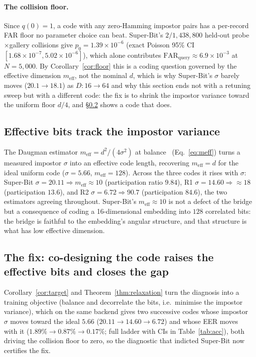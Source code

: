 \paragraph{The collision floor.} Since $q(0)=1$, a code with any zero-Hamming impostor pairs has a
per-record FAR floor no parameter choice can beat. Super-Bit's $2/1{,}438{,}800$ held-out
probe$\times$gallery collisions give $p_0 = 1.39\times10^{-6}$ (exact Poisson 95\% CI
$[1.68\times10^{-7}, 5.02\times10^{-6}]$), which alone contributes
$\mathrm{FAR}_{\text{query}}\approx6.9\times10^{-3}$ at $N=5{,}000$. By Corollary~\ref{cor:floor} this
is a coding question governed by the effective dimension $m_{\mathrm{eff}}$, not the nominal $d$, which
is why Super-Bit's $\sigma$ barely moves ($20.1 \to 18.1$) as $D:16\to64$ and why this section ends not
with a retuning sweep but with a different code: the fix is to shrink the impostor variance toward the
uniform floor $d/4$, and \S\ref{sec:fix} shows a code that does.

\subsection{Effective bits track the impostor variance}
\label{sec:effbits-params}

The Daugman estimator $m_{\mathrm{eff}} = d^2/(4\sigma^2)$ at balance~\cite{Daugman03}
(Eq.~\ref{eq:meff}) turns a measured impostor $\sigma$ into an effective code length, recovering
$m_{\mathrm{eff}}=d$ for the ideal uniform code ($\sigma=5.66$, $m_{\mathrm{eff}}=128$). Across the
three codes it rises with $\sigma$: Super-Bit $\sigma=20.11 \Rightarrow m_{\mathrm{eff}}\approx10$
(participation ratio $9.84$), R1 $\sigma=14.60 \Rightarrow \approx18$ (participation $13.6$), and R2
$\sigma=6.72 \Rightarrow 90.7$ (participation $84.6$), the two estimators agreeing throughout.
Super-Bit's $m_{\mathrm{eff}}\approx10$ is not a defect of the bridge but a consequence of coding a
16-dimensional embedding into $128$ correlated bits: the bridge is faithful to the embedding's angular
structure, and that structure is what has low effective dimension.

\subsection{The fix: co-designing the code raises the effective bits and closes the gap}
\label{sec:fix}

Corollary~\ref{cor:target} and Theorem~\ref{thm:relaxation} turn the diagnosis into a training
objective (balance and decorrelate the bits, i.e.\ minimise the impostor variance), which on the same
backend gives two successive codes whose impostor $\sigma$ moves toward the ideal $5.66$
($20.11 \to 14.60 \to 6.72$) and whose EER moves with it ($1.89\% \to 0.87\% \to 0.17\%$; full ladder
with CIs in Table~\ref{tab:acc}), both driving the collision floor to zero, so the diagnostic that
indicted Super-Bit now certifies the fix.

